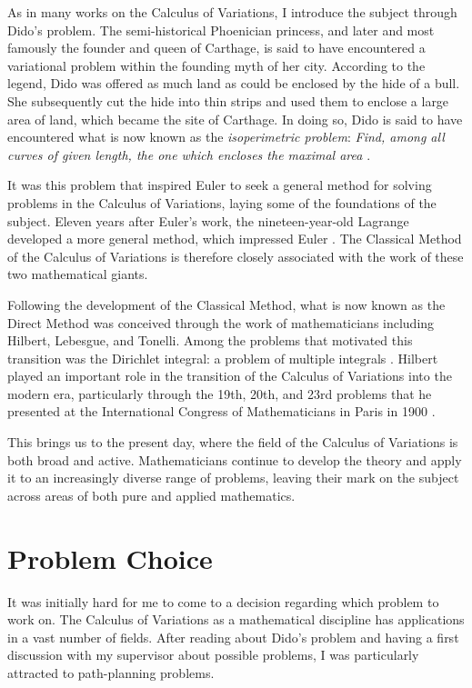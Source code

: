 As in many works on the Calculus of Variations, I introduce the subject through Dido’s problem. The semi-historical Phoenician princess, and later and most famously the founder and queen of Carthage, is said to have encountered a variational problem within the founding myth of her city. According to the legend, Dido was offered as much land as could be enclosed by the hide of a bull. She subsequently cut the hide into thin strips and used them to enclose a large area of land, which became the site of Carthage. In doing so, Dido is said to have encountered what is now known as the \textit{isoperimetric problem}: \textit{Find, among all curves of given length, the one which encloses the maximal area} \cite{bandle}.

It was this problem that inspired Euler to seek a general method for solving problems in the Calculus of Variations, laying some of the foundations of the subject. Eleven years after Euler’s work, the nineteen-year-old Lagrange developed a more general method, which impressed Euler \cite{bandle}. The Classical Method of the Calculus of Variations is therefore closely associated with the work of these two mathematical giants. 

Following the development of the Classical Method, what is now known as the Direct Method was conceived through the work of mathematicians including Hilbert, Lebesgue, and Tonelli. Among the problems that motivated this transition was the Dirichlet integral: a problem of multiple integrals \cite{dacorogna}. Hilbert played an important role in the transition of the Calculus of Variations into the modern era, particularly through the 19th, 20th, and 23rd problems that he presented at the International Congress of Mathematicians in Paris in 1900 \cite{rindler}.

This brings us to the present day, where the field of the Calculus of Variations is both broad and active. Mathematicians continue to develop the theory and apply it to an increasingly diverse range of problems, leaving their mark on the subject across areas of both pure and applied mathematics.

\section{Problem Choice}

It was initially hard for me to come to a decision regarding which problem to work on. The Calculus of Variations as a mathematical discipline has applications in a vast number of fields. After reading about Dido's problem and having a first discussion with my supervisor about possible problems, I was particularly attracted to path-planning problems.

